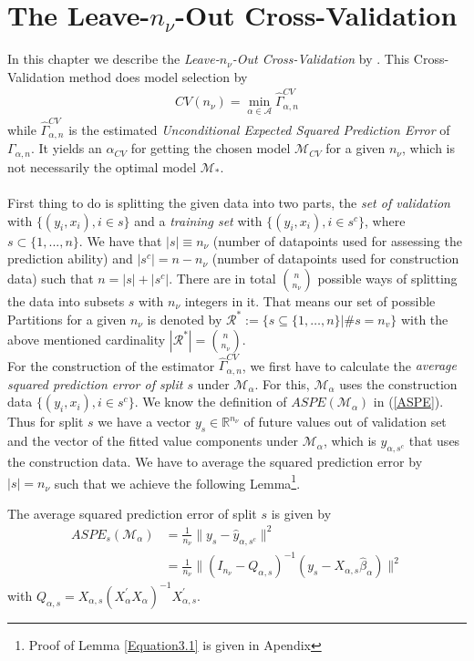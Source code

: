 \documentclass[Research_Module_ES.tex]{subfiles}
\begin{document}
\section{The Leave-$n_\nu$-Out Cross-Validation}
In this chapter we describe the \textit{Leave-$n_\nu$-Out Cross-Validation} by \cite{shao}. This Cross-Validation method does model selection by
\begin{align*}
CV(n_\nu)=\min_{\alpha\in\mathcal{A}}\hat{\Gamma}_{\alpha,n}^{CV}
\end{align*}
while $\hat{\Gamma}_{\alpha,n}^{CV}$ is the estimated \textit{Unconditional Expected Squared Prediction Error} of $\Gamma_{\alpha,n}$. It yields an $\alpha_{CV}$ for getting the chosen model $\mathcal{M}_{CV}$ for a given $n_\nu$, which is not necessarily the optimal model $\mathcal{M}_\ast$.\\\\
First thing to do is splitting the given data into two parts, the \textit{set of validation} with $\{(y_i,x_i), i\in s\}$ and a \textit{training set} with $\{(y_i,x_i), i\in s^c\}$, where $s\subset\{1,...,n\}$. We have that $|s|\equiv n_\nu$ (number of datapoints used for assessing the prediction ability) and $|s^c|=n-n_\nu$ (number of datapoints used for
construction data) such that $n=|s|+|s^c|$. There are in total
$\binom{n}{n_\nu}$ possible ways of splitting the data into subsets $s$ with $n_\nu$ integers in it. That means our set of possible Partitions for a given $n_\nu$ is denoted by $\mathcal{R}^\ast:= \{s\subseteq\{1,\dots,n\}|\# s=n_v\}$ with the above mentioned cardinality $|\mathcal{R}^\ast|=\binom{n}{n_\nu}$.\\

For the construction of the estimator $\hat{\Gamma}_{\alpha,n}^{CV}$, we first have to calculate the \textit{average squared prediction error of split $s$} under $\mathcal{M}_\alpha$. For this,   $\mathcal{M}_\alpha$ uses the construction data $\{(y_i,x_i), i\in s^c\}$. We know the definition of $ASPE(\mathcal{M}_\alpha)$ in (\ref{ASPE}). Thus for split $s$ we have a vector $y_s\in\mathbb{R}^{n_\nu}$ of future values out of validation set and the vector of the fitted value components under $\mathcal{M}_\alpha$, which is $\hat{y}_{\alpha,s^c}$ that uses the construction data. We have to average the squared prediction error by $|s|=n_\nu$ such that we achieve the following Lemma\footnote{Proof of Lemma \ref{Equation3.1} is given in Apendix }.
\begin{lemma}
	\label{Equation3.1}
	The average squared prediction error of split $s$ is given by
	\begin{align*}
		ASPE_{s}(\mathcal{M}_\alpha)&=\frac{1}{n_\nu}\parallel y_s-\hat{y}_{\alpha,s^c}\parallel^2\\
		&=\frac{1}{n_\nu}\parallel (I_{n_\nu}-Q_{\alpha,s})^{-1}(y_s-X_{\alpha,s}\hat{\beta}_\alpha)\parallel^2
	\end{align*}
	with $Q_{\alpha,s}=X_{\alpha,s}(X_\alpha^\prime X_\alpha)^{-1}X_{\alpha,s}^\prime$.
\end{lemma}
\end{document}
